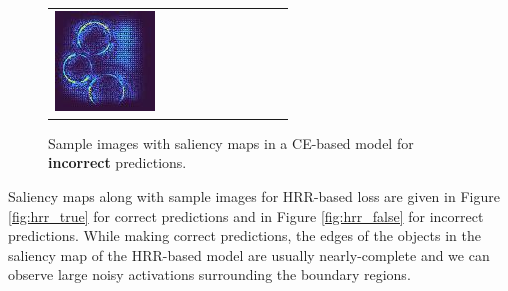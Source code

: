 \documentclass[letterpaper]{article} %
\begin{document}
\begin{figure}[!htbp]
\begin{tabular}{cccccccccc}
\multicolumn{1}{c}{\includegraphics[width=0.07\columnwidth]{figures/appendix/ce/false/82_slc.jpg}} \hspace{-11pt}
\end{tabular}
\caption{Sample images with saliency maps in a CE-based model for \textbf{incorrect} predictions.}
\label{fig:ce_false}
\end{figure}


Saliency maps along with sample images for HRR-based loss are given in Figure \ref{fig:hrr_true} for correct predictions and in Figure \ref{fig:hrr_false} for incorrect predictions. While making correct predictions, the edges of the objects in the saliency map of the HRR-based model are usually nearly-complete and we can observe large noisy activations surrounding the boundary regions.
\end{document}
